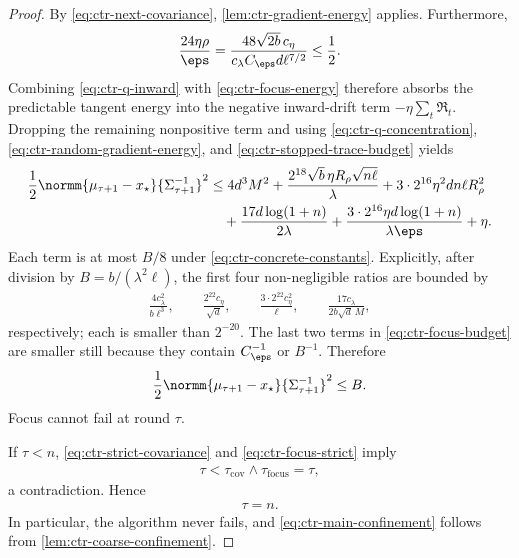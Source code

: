 \begin{proof}
    By \eqref{eq:ctr-next-covariance},
    \cref{lem:ctr-gradient-energy} applies.  Furthermore,
    \begin{align}
        \frac{24\eta\rho}{\eps}
        =\frac{48\sqrt{2b}\,c_\eta}
        {c_\lambda C_\eps d\ell^{7/2}}
        \leq\frac12.
        \label{eq:ctr-regret-absorption-condition}
    \end{align}
    Combining \eqref{eq:ctr-q-inward} with
    \eqref{eq:ctr-focus-energy} therefore absorbs the predictable tangent
    energy into the negative inward-drift term $-\eta\sum_t\mathfrak R_t$.
    Dropping the remaining nonpositive term and using
    \eqref{eq:ctr-q-concentration},
    \eqref{eq:ctr-random-gradient-energy}, and
    \eqref{eq:ctr-stopped-trace-budget} yields
    \begin{align}
        \frac12
        \normm{\mu_{\tau+1}-x_\star}{\Sigma_{\tau+1}^{-1}}^2
         & \leq4d^3M^2
        +\frac{2^{18}\sqrt b\,\eta R_\rho\sqrt{n\ell}}\lambda
        +3\cdot2^{16}\eta^2dn\ell R_\rho^2
        \nonumber      \\
         & \quad
        +\frac{17d\log(1+n)}{2\lambda}
        +\frac{3\cdot2^{16}\eta d\log(1+n)}{\lambda\eps}
        +\eta.
        \label{eq:ctr-focus-budget}
    \end{align}
    Each term is at most $B/8$ under
    \eqref{eq:ctr-concrete-constants}.  Explicitly, after division by
    $B=b/(\lambda^2\ell)$, the first four non-negligible ratios are bounded by
    \begin{align}
        \frac{4c_\lambda^2}{b\ell^3},
        \qquad
        \frac{2^{22}c_\eta}{\sqrt d},
        \qquad
        \frac{3\cdot2^{22}c_\eta^2}{\ell},
        \qquad
        \frac{17c_\lambda}{2b\sqrt d\,M},
    \end{align}
    respectively; each is smaller than $2^{-20}$.  The last two terms in
    \eqref{eq:ctr-focus-budget} are smaller still because they contain
    $C_\eps^{-1}$ or $B^{-1}$.  Therefore
    \begin{align}
        \frac12
        \normm{\mu_{\tau+1}-x_\star}{\Sigma_{\tau+1}^{-1}}^2
        \leq B.
        \label{eq:ctr-focus-strict}
    \end{align}
    Focus cannot fail at round $\tau$.

    If $\tau<n$, \eqref{eq:ctr-strict-covariance} and
    \eqref{eq:ctr-focus-strict} imply
    \begin{align}
        \tau<\tau_{\mathrm{cov}}\wedge\tau_{\mathrm{focus}}=\tau,
    \end{align}
    a contradiction.  Hence
    \begin{align}
        \tau=n.
        \label{eq:ctr-global-stability}
    \end{align}
    In particular, the algorithm never fails, and
    \eqref{eq:ctr-main-confinement} follows from
    \cref{lem:ctr-coarse-confinement}.


\end{proof}
